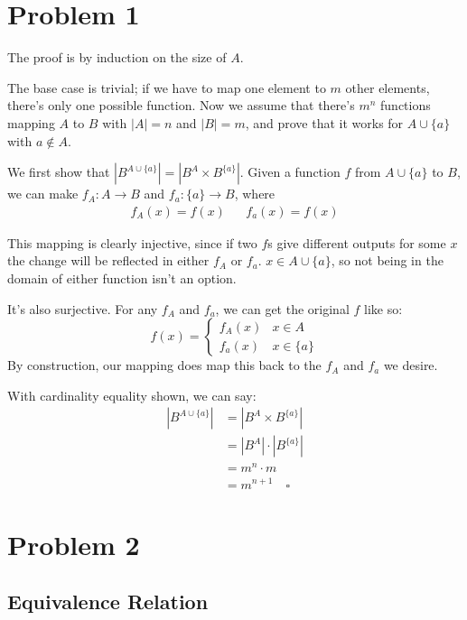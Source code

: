 \documentclass[12pt]{article}
\begin{document}
\section{Problem 1}

The proof is by induction on the size of $A$.

The base case is trivial; if we have to map one element to $m$
other elements, there's only one possible function.
Now we assume that there's $m^n$ functions mapping $A$ to $B$
with $|A|=n$ and $|B|=m$, and prove that it works for $A \cup \{a\}$ with $a \notin A$.

We first show that $\left|B^{A \cup \{a\}}\right|=\left|B^A \times B^{\{a\}}\right|$.
Given a function $f$ from $A \cup \{a\}$ to $B$, we can make $f_A: A \to B$ and $f_a: \{a\} \to B$, where
\begin{align*}
  f_A(x)=f(x) && f_a(x)=f(x)
\end{align*}

This mapping is clearly injective, since if two $f$s give different outputs
for some $x$ the change will be reflected in either $f_A$ or $f_a$.
$x \in A \cup \{a\}$, so not being in the domain of either function isn't an option.

It's also surjective.
For any $f_A$ and $f_a$, we can get the original $f$ like so:
\[f(x)=\begin{cases}
  f_A(x) & x \in A \\
  f_a(x) & x \in \{a\}
\end{cases}\]
By construction, our mapping does map this back to the $f_A$ and $f_a$ we desire.

With cardinality equality shown, we can say:
\begin{align*}
  \left|B^{A \cup \{a\}}\right|
   & =\left|B^A \times B^{\{a\}}\right| \\
   & =\left|B^A\right| \cdot \left|B^{\{a\}}\right|    \\
   & = m^n \cdot m                      \\
   & = m^{n+1}\quad\square
\end{align*}
\pagebreak

\section{Problem 2}

\subsection{Equivalence Relation}
\end{document}
